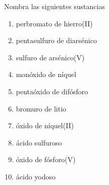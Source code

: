 \begin{exercise}[
    tags    = {inorgánica,formulación,múltiple,2B},
    topics  = {química inorgánica,formulación,nomenclatura},
    source  = {Química 2B SAN 2016, p372, e13},
  ]
  Nombra las siguientes sustancias

  \begin{enumerate}
    \item perbromato de hierro(II)
    \item pentasulfuro de diarsénico
    \item sulfuro de arsénico(V)
    \item monóxido de níquel
    \item pentaóxido de difósforo
    \item bromuro de litio
    \item óxido de níquel(II)
    \item ácido sulfuroso
    \item óxido de fósforo(V)
    \item ácido yodoso
  \end{enumerate}
\end{exercise}

\begin{solution}
  \begin{enumerate}\begin{multicols}{2}
    \item {}
    \item {}
    \item {}
    \item {}
    \item {}
    \item {}
    \item {}
    \item {}
    \item {}
    \item {}
  \end{multicols}\end{enumerate}
\end{solution}




